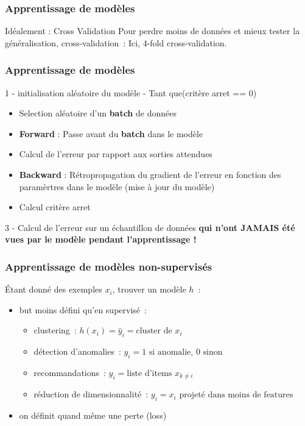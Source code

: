 \begin{frame}
  \frametitle{Apprentissage de modèles}
  Idéalement : Cross Validation
  Pour \og perdre\fg{} moins de données et mieux tester la
  généralisation, cross-validation :
  Ici, 4-fold cross-validation.
\end{frame}

\begin{frame}
  \frametitle{Apprentissage de modèles}
  1 - initialisation aléatoire du modèle
   - Tant que(critère arret == 0)
  \begin{itemize}
  \item Selection aléatoire d'un \textbf{batch} de données
  \item \textbf{Forward} : Passe avant du \textbf{batch} dans le modèle
  \item Calcul de l'erreur par rapport aux sorties attendues
  \item \textbf{Backward} : Rétropropagation du gradient de l'erreur en fonction des paramèrtres dans le modèle (mise à jour du modèle)
  \item Calcul critère arret
  \end{itemize}
  3 - Calcul de l'erreur sur un échantillon de données  \textbf{qui n'ont JAMAIS été vues par le modèle pendant l'apprentissage !}
\end{frame}

\begin{frame}
  \frametitle{Apprentissage de modèles non-supervisés}
  Étant donné des exemples $x_i$, trouver un modèle $h$ :
  \begin{itemize}[<+->]
  \item but moins défini qu'en supervisé :
    \begin{itemize}[<+->]
    \item clustering : $h(x_i) = \hat{y}_i = \text{cluster de }x_i$
    \item détection d'anomalies : $y_i = 1 \text{ si anomalie, }0
      \text{ sinon}$
    \item recommandations : $y_i = \text{liste d'items }x_{k\neq i}$
    \item réduction de dimensionnalité : $y_i = x_i \text{ projeté dans
      moins de features}$
    \end{itemize}
  \item on définit quand même une perte (loss) \\[.2cm]
    \\[.2cm]
    \\[.2cm]
  \end{itemize}
\end{frame}

